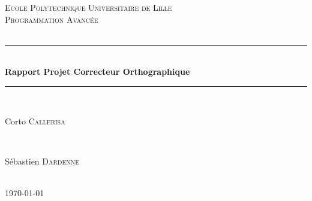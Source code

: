 \documentclass[12pt]{article}
\begin{document}
\begin{titlepage}

\newcommand{\HRule}{\rule{\linewidth}{0.5mm}} %

\center %
 

\textsc{\LARGE Ecole Polytechnique Universitaire de Lille}\\[1.5cm] %
\textsc{\Large Programmation Avancée}\\[0.5cm] %
\textsc{\large }\\[0.5cm] %


\HRule \\[0.4cm]
{ \huge \bfseries Rapport Projet Correcteur Orthographique}\\[0.4cm] %
\HRule \\[1.5cm]
 


\begin{minipage}{0.4\textwidth}
\begin{flushleft} \large
Corto \textsc{Callerisa} %
\end{flushleft}
\end{minipage}
~
\begin{minipage}{0.4\textwidth}
\begin{flushright} \large
Sébastien \textsc{Dardenne} %
\end{flushright}
\end{minipage}\\[2cm]



{\large \today}\\[2cm] %



\end{titlepage}
\end{document}
